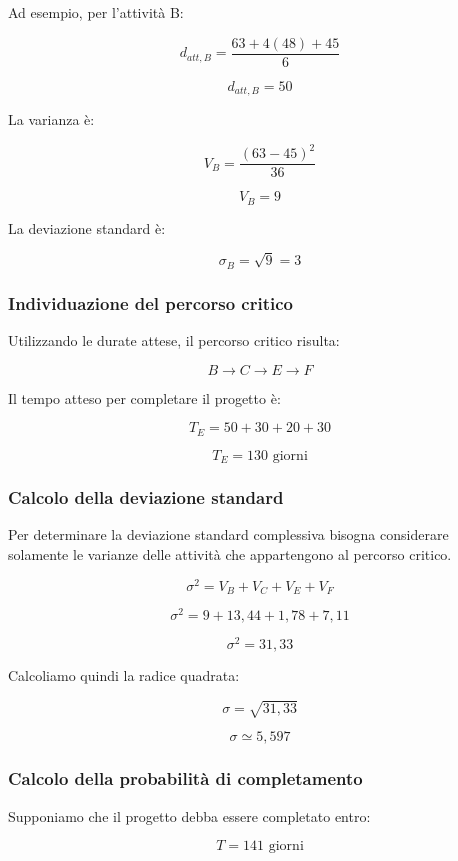 \noindent Ad esempio, per l'attività B:

\[
d_{att,B}=\frac{63+4(48)+45}{6}
\]

\[
\boxed{d_{att,B}=50}
\]

\noindent La varianza è:

\[
V_B=\frac{(63-45)^2}{36}
\]

\[
\boxed{V_B=9}
\]

\noindent La deviazione standard è:

\[
\sigma_B=\sqrt{9}=\boxed{3}
\]

\subsubsection*{Individuazione del percorso critico}

\noindent Utilizzando le durate attese, il percorso critico
risulta:

\[
\boxed{B\rightarrow C\rightarrow E\rightarrow F}
\]

\noindent Il tempo atteso per completare il progetto è:

\[
T_E=50+30+20+30
\]

\[
\boxed{T_E=130\text{ giorni}}
\]

\subsubsection*{Calcolo della deviazione standard}

\noindent Per determinare la deviazione standard complessiva
bisogna considerare solamente le varianze delle attività
che appartengono al percorso critico.

\[
\sigma^2=V_B+V_C+V_E+V_F
\]

\[
\sigma^2=9+13{,}44+1{,}78+7{,}11
\]

\[
\boxed{\sigma^2=31{,}33}
\]

\noindent Calcoliamo quindi la radice quadrata:

\[
\sigma=\sqrt{31{,}33}
\]

\[
\boxed{\sigma\simeq5{,}597}
\]

\subsubsection*{Calcolo della probabilità di completamento}

\noindent Supponiamo che il progetto debba essere
completato entro:

\[
T=141\text{ giorni}
\]

